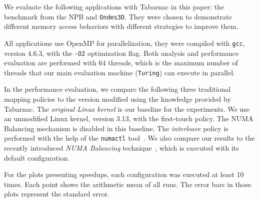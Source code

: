 We evaluate the following applications with \gls{Tabarnac} in this paper: the \IS benchmark from the \gls{NPB} and \texttt{Ondes3D}.
They were chosen to demonstrate different memory access behaviors with different strategies to improve them.

All applications use OpenMP for parallelization, they were compiled with \texttt{gcc}, version 4.6.3, with the \texttt{-O2} optimization flag.
Both analysis and performance evaluation are performed with $64$ threads, which is the maximum number of threads that our main evaluation machine (\texttt{Turing}) can execute in parallel.

In the performance evaluation, we compare the following three traditional mapping policies to the version modified using the knowledge provided by \gls{Tabarnac}.
The \emph{original Linux kernel} is our baseline for the experiments. We use an unmodified Linux kernel, version 3.13, with the first-touch policy.
The NUMA Balancing mechanism is disabled in this baseline.
The \emph{interleave} policy is performed with the help of the \texttt{numactl} tool~\cite{Kleen05NUMA}.
We also compare our results to the recently introduced \emph{NUMA Balancing} technique~\cite{Corbet12Toward}, which is executed with its default configuration.

For the plots presenting speedups, each configuration was executed at least 10 times. Each point shows the arithmetic mean of all runs.
The error bars in those plots represent the standard error.

